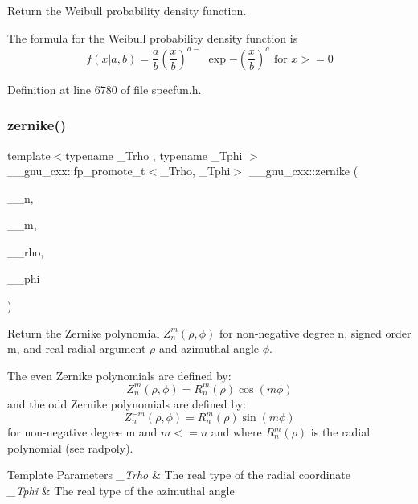 Return the Weibull probability density function. 

The formula for the Weibull probability density function is \[ f(x | a, b) = \frac{a}{b} \left(\frac{x}{b} \right)^{a-1} \exp{-\left(\frac{x}{b}\right)^a} \mbox{ for } x >= 0 \] 

Definition at line 6780 of file specfun.\+h.

\mbox{\label{group__mathsf__gnu_gaaed33f29c1eb1d2c5b9590fe2e57151c}} 
\subsubsection{\texorpdfstring{zernike()}{zernike()}}
{\footnotesize\ttfamily template$<$typename \+\_\+\+Trho , typename \+\_\+\+Tphi $>$ \\
\+\_\+\+\_\+gnu\+\_\+cxx\+::fp\+\_\+promote\+\_\+t$<$\+\_\+\+Trho, \+\_\+\+Tphi$>$ \+\_\+\+\_\+gnu\+\_\+cxx\+::zernike (\begin{DoxyParamCaption}\item[{unsigned int}]{\+\_\+\+\_\+n,  }\item[{int}]{\+\_\+\+\_\+m,  }\item[{\+\_\+\+Trho}]{\+\_\+\+\_\+rho,  }\item[{\+\_\+\+Tphi}]{\+\_\+\+\_\+phi }\end{DoxyParamCaption})\hspace{0.3cm}{\ttfamily [inline]}}

Return the Zernike polynomial $ Z_n^m(\rho,\phi) $ for non-\/negative degree {\ttfamily n}, signed order {\ttfamily m}, and real radial argument $ \rho $ and azimuthal angle $ \phi $.

The even Zernike polynomials are defined by\+: \[ Z_n^m(\rho,\phi) = R_n^m(\rho)\cos(m\phi) \] and the odd Zernike polynomials are defined by\+: \[ Z_n^{-m}(\rho,\phi) = R_n^m(\rho)\sin(m\phi) \] for non-\/negative degree {\ttfamily m} and $ m <= n $ and where $ R_n^m(\rho) $ is the radial polynomial (see radpoly).


\begin{DoxyTemplParams}{Template Parameters}
{\em \+\_\+\+Trho} & The real type of the radial coordinate \\
\hline
{\em \+\_\+\+Tphi} & The real type of the azimuthal angle \\
\hline
\end{DoxyTemplParams}

